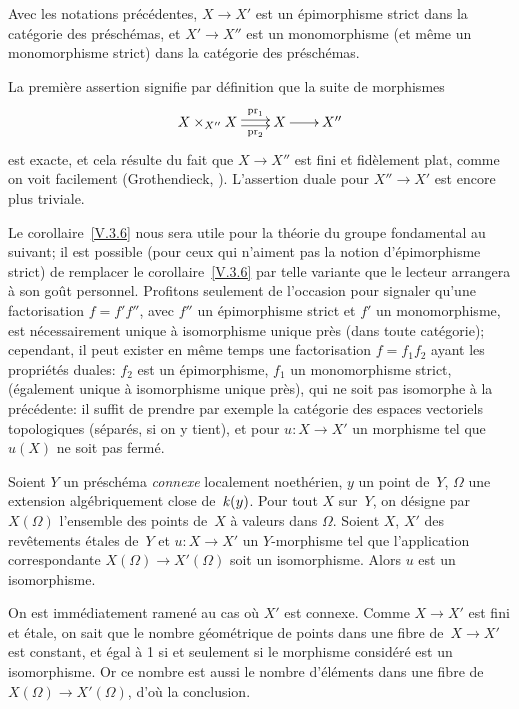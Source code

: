 \begin{corollaire}
\label{V.3.6} Avec les notations pr\'ec\'edentes, $X \to X'$
est un \'epimorphisme strict dans la cat\'egorie des
pr\'esch\'emas, et $X' \to X''$ est un monomorphisme (et m\^eme
un monomorphisme strict) dans la cat\'egorie des pr\'esch\'emas.
\end{corollaire}

La premi\`ere assertion signifie par d\'efinition que la suite de
morphismes
$$
\xymatrix@C=.7cm{{X \times_{X''} X}\ar@<2pt>[r]^-{\pr_1}\ar@<-2pt>[r]_-{\pr_2}&{X}\ar[r]&{X''}}
$$
est exacte, et cela r\'esulte du fait que $X \to X''$ est fini et
fid\`element plat, comme on voit facilement (\cf Grothendieck, \loccit). L'assertion duale pour $X'' \to X'$ est encore plus triviale.

Le corollaire~\ref{V.3.6} nous sera utile pour la th\'eorie du
groupe fondamental au \No suivant; il est possible (pour ceux
qui n'aiment pas la notion d'\'epimorphisme strict) de remplacer le
corollaire~\ref{V.3.6} par telle variante que le lecteur arrangera
\`a son go\^ut personnel. Profitons seulement de l'occasion pour
signaler qu'une factorisation
$f=f'f''$, avec $f''$ un \'epimorphisme strict et $f'$ un
monomorphisme, est n\'ecessairement unique \`a isomorphisme unique
pr\`es (dans toute cat\'egorie); cependant, il peut exister en
m\^eme temps une factorisation $f=f_1f_2$ ayant les
propri\'et\'es duales: $f_2$ est un \'epimorphisme, $f_1$ un
monomorphisme strict, (\'egalement unique \`a isomorphisme unique
pr\`es), qui ne soit pas isomorphe \`a la pr\'ec\'edente: il
suffit de prendre par exemple la cat\'egorie des espaces vectoriels
topologiques (s\'epar\'es, si on y tient), et pour $u \colon X \to
X'$ un morphisme tel que $u(X)$ ne soit pas ferm\'e.

\begin{proposition}
\label{V.3.7} Soient $Y$ un pr\'esch\'ema \emph{connexe} localement
noeth\'erien, $y$ un point de~$Y$, $\mathit{\Omega}$ une extension
alg\'ebriquement close
de~$\mathit{k}(y)$. Pour tout $X$ sur~$Y$, on
d\'esigne par $X(\Omega)$ l'ensemble des points de~$X$
\`a valeurs dans $\Omega$. Soient $X$, $X'$ des rev\^etements
\'etales de~$Y$ et $u \colon X \to X'$ un $Y$-morphisme tel que
l'application correspondante $X(\Omega) \to
X'(\Omega)$ soit un isomorphisme. Alors $u$ est un
isomorphisme.
\end{proposition}

On est imm\'ediatement ramen\'e au cas o\`u $X'$ est
connexe. Comme $X \to X'$ est fini et \'etale, on sait que le nombre
g\'eom\'etrique de points dans une fibre de~$X \to X'$ est
constant, et \'egal \`a 1 si et seulement si le morphisme
consid\'er\'e est un isomorphisme. Or ce nombre est aussi le
nombre d'\'el\'ements dans une fibre de~$X(\Omega) \to
X'(\Omega)$, d'o\`u la conclusion.
\enlargethispage{.5cm}
